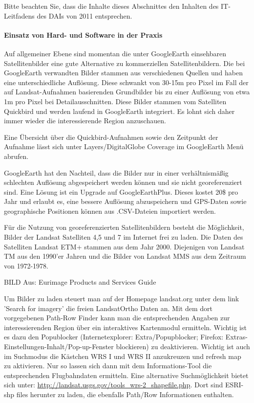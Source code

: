 %
%
Bitte beachten Sie, dass die Inhalte dieses Abschnittes den Inhalten des IT-Leitfadens des DAIs von 2011 entsprechen.
\begin{center}
\tib{\rule{0.9\textwidth}{0.2mm}}\vspace{3mm}
\end{center}

\paragraph{Einsatz von Hard- und Software in der Praxis}
Auf allgemeiner Ebene sind momentan die unter GoogleEarth einsehbaren Satellitenbilder eine gute Alternative zu kommerziellen Satellitenbildern. Die bei GoogleEarth verwandten Bilder stammen aus verschiedenen Quellen und haben eine unterschiedliche Auflösung. Diese schwankt von 30-15m pro Pixel im Fall der auf Landsat-Aufnahmen basierenden Grundbilder bis zu einer Auflösung von etwa 1m pro Pixel bei Detailausschnitten. Diese Bilder stammen vom Satelliten Quickbird und werden laufend in GoogleEarth integriert. Es lohnt sich daher immer wieder die interessierende Region anzuschauen.

Eine Übersicht über die Quickbird-Aufnahmen sowie den Zeitpunkt der Aufnahme lässt sich unter Layers/DigitalGlobe Coverage im GoogleEarth Menü abrufen.

GoogleEarth hat den Nachteil, dass die Bilder nur in einer verhältnismäßig schlechten Auflösung abgespeichert werden können und sie nicht georeferenziert sind. Eine Lösung ist ein Upgrade auf GoogleEarthPlus. Dieses kostet 20\$ pro Jahr und erlaubt es, eine bessere Auflösung abzuspeichern und GPS-Daten sowie geographische Positionen können aus .CSV-Dateien importiert werden.

Für die Nutzung von georeferenzierten Satellitenbildern besteht die Möglichkeit, Bilder der Landsat Satelliten 4,5 und 7 im Internet frei zu laden. Die Daten des Satelliten Landsat ETM+ stammen aus dem Jahr 2000. Diejenigen von Landsat TM aus den 1990'er Jahren und die Bilder von Landsat MMS aus dem Zeitraum von 1972-1978.

BILD Aus: Eurimage Products and Services Guide

Um Bilder zu laden steuert man auf der Homepage landsat.org unter dem link 'Search for imagery' die freien LandsatOrtho Daten an. Mit dem dort vorgegebenen Path-Row Finder kann man die entsprechenden Angaben zur interessierenden Region über ein interaktives Kartenmodul ermitteln. Wichtig ist es dazu den Popublocker (Internetexplorer: Extra/Popupblocker; Firefox: Extras-Einstellungen-Inhalt/Pop-up-Fenster blockieren) zu deaktivieren. Wichtig ist auch im Suchmodus die Kästchen WRS I und WRS II anzukreuzen und refresh map zu aktivieren. Nur so lassen sich dann mit dem Informations-Tool die entsprechenden Flugbahndaten ermitteln. Eine alternative Suchmöglichkeit bietet sich unter: \url{http://landsat.usgs.gov/tools_wrs-2_shapefile.php}. Dort sind ESRI-shp files herunter zu laden, die ebenfalls Path/Row Informationen enthalten.

